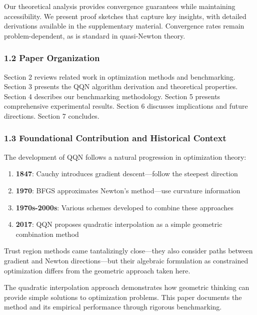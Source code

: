 Our theoretical analysis provides convergence guarantees while maintaining accessibility.
We present proof sketches that capture key insights, with detailed derivations available in the supplementary material.
Convergence rates remain problem-dependent, as is standard in quasi-Newton theory.

\hypertarget{paper-organization}{%
\subsubsection{1.2 Paper Organization}\label{paper-organization}}

Section 2 reviews related work in optimization methods and benchmarking.
Section 3 presents the QQN algorithm derivation and theoretical properties.
Section 4 describes our benchmarking methodology.
Section 5 presents comprehensive experimental results.
Section 6 discusses implications and future directions.
Section 7 concludes.

\hypertarget{foundational-contribution-and-historical-context}{%
\subsubsection{1.3 Foundational Contribution and Historical Context}\label{foundational-contribution-and-historical-context}}

The development of QQN follows a natural progression in optimization theory:

\begin{enumerate}
\def\labelenumi{\arabic{enumi}.}
\tightlist
\item
  \textbf{1847}: Cauchy introduces gradient descent---follow the steepest direction
\item
  \textbf{1970}: BFGS approximates Newton's method---use curvature information
\item
  \textbf{1970s-2000s}: Various schemes developed to combine these approaches
\item
  \textbf{2017}: QQN proposes quadratic interpolation as a simple geometric combination method
\end{enumerate}

Trust region methods came tantalizingly close---they also consider paths between gradient and Newton directions---but their algebraic formulation as constrained optimization differs from the geometric approach taken here.

The quadratic interpolation approach demonstrates how geometric thinking can provide simple solutions to optimization problems. This paper documents the method and its empirical performance through rigorous benchmarking.

